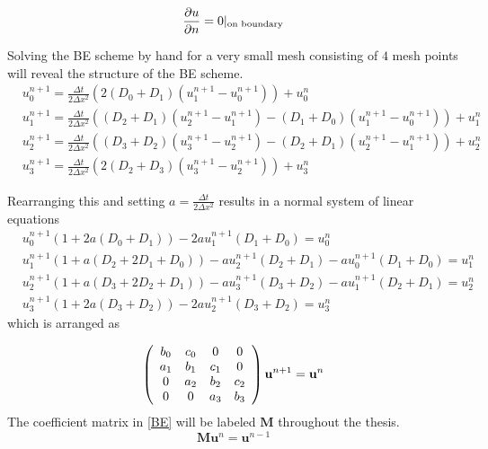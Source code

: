 \begin{equation}\label{theory:Neumann_boundaries}
 \frac{\partial u}{\partial n} = 0|_{\text{on boundary}}
\end{equation}

\noindent Solving the BE scheme by hand for a very small mesh consisting of $4$ mesh points will reveal the structure of the BE scheme.
\begin{align*}
 &u^{n+1}_0 =  \frac{\Delta t}{2\Delta x^2}\left(2(D_{0}+D_{1})(u^{n+1}_{1}-u^{n+1}_{0})\right) + u^n_0\\
 &u^{n+1}_1 = \frac{\Delta t}{2\Delta x^2}\left((D_{2}+D_{1})(u^{n+1}_{2}-u^{n+1}_{1})-(D_{1}+D_{0})(u^{n+1}_{1}-u^{n+1}_{0})\right) + u^n_1\\
 &u^{n+1}_2 = \frac{\Delta t}{2\Delta x^2}\left((D_{3}+D_{2})(u^{n+1}_{3}-u^{n+1}_{2})-(D_{2}+D_{1})(u^{n+1}_{2}-u^{n+1}_{1})\right) + u^n_2 \\
 &u^{n+1}_3 =  \frac{\Delta t}{2\Delta x^2}\left(2(D_{2}+D_{3})(u^{n+1}_{3}-u^{n+1}_{2})\right) + u^n_3
\end{align*}

\noindent Rearranging this and setting $a = \frac{\Delta t}{2\Delta x^2}$ results in a normal system of linear equations
\begin{align*}
 &u^{n+1}_0\left(1+2a(D_0+D_1)\right)- 2au^{n+1}_{1}(D_1+D_0) =  u^n_0\\
 &u^{n+1}_1\left(1+a(D_2+2D_1+D_0)\right)-au^{n+1}_{2}(D_2+D_1)-au^{n+1}_{0}(D_1+D_0) = u^n_1\\
 &u^{n+1}_2\left(1+a(D_3+2D_2+D_1)\right)-au^{n+1}_{3}(D_3+D_2)-au^{n+1}_{1}(D_2+D_1) = u^n_2\\
 &u^{n+1}_3\left(1+2a(D_3+D_2)\right)- 2au^{n+1}_{2}(D_3+D_2) =  u^n_3
\end{align*}
which is arranged as 

\begin{align}\label{BE}
 \left(\begin{array}{c c c c}
        b_0 & c_0 &0 &0 \\
        a_1 & b_1 & c_1 &0 \\
        0& a_2 & b_2& c_2\\
        0& 0& a_3 & b_3\\
       \end{array}\right)\mathbf{u}^{n+1} = \mathbf{u}^{n}
\end{align}
\noindent The coefficient matrix in \eqref{BE} will be labeled $\mathbf M$ throughout the thesis.
\begin{equation}\label{theory:BE:linear_system}
  \mathbf{M}\mathbf{u}^n = \mathbf{u}^{n-1}
\end{equation}

